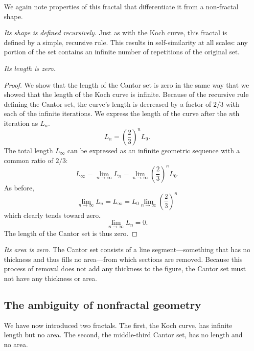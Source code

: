 We again note properties of this fractal that differentiate it from a non-fractal shape.

\begin{myobs}\textit{Its shape is defined recursively.} Just as with the Koch curve, this fractal is defined by a simple, recursive rule. This results in self-similarity at all scales: any portion of the set contains an infinite number of repetitions of the original set.\end{myobs}

\begin{myobs}\textit{Its length is zero.}\end{myobs}
\begin{proof}
We show that the length of the Cantor set is zero in the same way that we showed that the length of the Koch curve is infinite. 
Because of the recursive rule defining the Cantor set, the curve's length is decreased by a factor of $ 2/3 $ with each of the infinite iterations. We express the length of the curve after the $n$th iteration as $L_n$. 
\begin{equation}
	L_n = \left(\frac{2}{3}\right)^n L_0.
\end{equation}
The total length $L_\infty$ can be expressed as an infinite geometric sequence with a common ratio of $ 2/3 $:
\begin{equation}
	L_\infty = \lim_{n \to \infty}L_n = \lim_{n \to \infty}\left(\frac{2}{3}\right)^n L_0.
\end{equation}
As before,
\begin{equation}
	\lim_{n \to \infty}L_n = L_\infty = L_0 \lim_{n \to \infty} \left(\frac{2}{3}\right)^n
\end{equation}
which clearly tends toward zero.
\begin{equation}
	\lim_{n \to \infty}L_n = 0. 
\end{equation}
The length of the Cantor set is thus zero.
\end{proof}

\begin{myobs}\textit{Its area is zero.} The Cantor set consists of a line segment---something that has no thickness and thus fills no area---from which sections are removed. Because this process of removal does not add any thickness to the figure, the Cantor set must not have any thickness or area.\end{myobs}

\subsection{The ambiguity of nonfractal geometry}
We have now introduced two fractals. The first, the Koch curve, has infinite length but no area. The second, the middle-third Cantor set, has no length and no area. 

